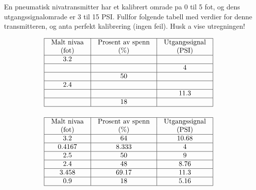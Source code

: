 

En pneumatisk nivatransmitter har et kalibrert omrade pa 0 til 5 fot, og dens utgangssignalomrade er 3 til 15 PSI.  Fullfor folgende tabell med verdier for denne transmitteren, og anta perfekt kalibrering (ingen feil).  Husk a vise utregningen!


$$\vbox{\offinterlineskip
\halign{\strut
\vrule \quad\hfil # \ \hfil & 
\vrule \quad\hfil # \ \hfil & 
\vrule \quad\hfil # \ \hfil \vrule \cr
\noalign{\hrule}
%
Malt nivaa & Prosent av spenn & Utgangssignal \cr
%
(fot) & (\%) & (PSI) \cr
%
\noalign{\hrule}
%
3.2 &  &  \cr
%
\noalign{\hrule}
%
 &  & 4 \cr
%
\noalign{\hrule}
%
 & 50 &  \cr
%
\noalign{\hrule}
%
2.4 &  &  \cr
%
\noalign{\hrule}
%
 &  & 11.3 \cr
%
\noalign{\hrule}
%
 & 18 &  \cr
%
\noalign{\hrule}
} %
}$$ %








$$\vbox{\offinterlineskip
\halign{\strut
\vrule \quad\hfil # \ \hfil & 
\vrule \quad\hfil # \ \hfil & 
\vrule \quad\hfil # \ \hfil \vrule \cr
\noalign{\hrule}
%
Malt nivaa & Prosent av spenn & Utgangssignal \cr
%
(fot) & (\%) & (PSI) \cr
%
\noalign{\hrule}
%
3.2 & 64 & 10.68 \cr
%
\noalign{\hrule}
%
0.4167 & 8.333 & 4 \cr
%
\noalign{\hrule}
%
2.5 & 50 & 9 \cr
%
\noalign{\hrule}
%
2.4 & 48 & 8.76 \cr
%
\noalign{\hrule}
%
3.458 & 69.17 & 11.3 \cr
%
\noalign{\hrule}
%
0.9 & 18 & 5.16 \cr
%
\noalign{\hrule}
} %
}$$ %












